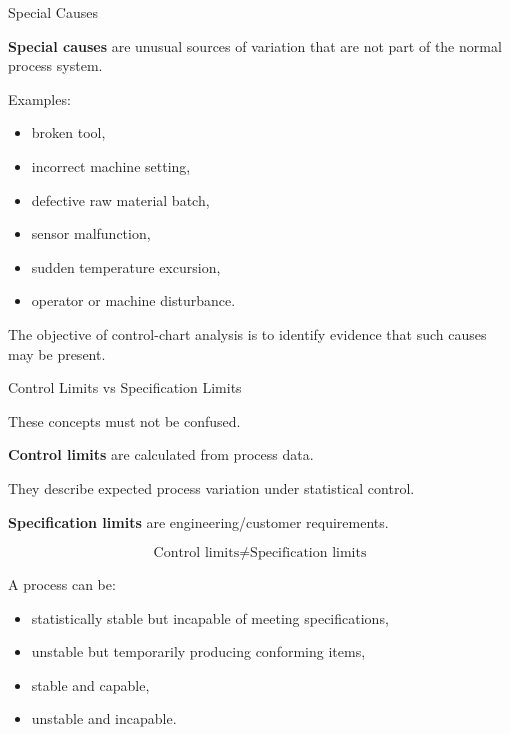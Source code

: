 \documentclass[aspectratio=169,10pt]{beamer}
\begin{document}

\begin{frame}[shrink=18]{Special Causes}
\small

\textbf{Special causes} are unusual sources of variation that are
not part of the normal process system.

Examples:

\begin{itemize}
    \item broken tool,
    \item incorrect machine setting,
    \item defective raw material batch,
    \item sensor malfunction,
    \item sudden temperature excursion,
    \item operator or machine disturbance.
\end{itemize}

The objective of control-chart analysis is to identify evidence
that such causes may be present.

\end{frame}


\begin{frame}[shrink=18]{Control Limits vs Specification Limits}
\small

These concepts must not be confused.

\textbf{Control limits} are calculated from process data.

They describe expected process variation under statistical control.

\textbf{Specification limits} are engineering/customer requirements.

\[
\boxed{
\text{Control limits}\neq\text{Specification limits}
}
\]

A process can be:

\begin{itemize}
    \item statistically stable but incapable of meeting specifications,
    \item unstable but temporarily producing conforming items,
    \item stable and capable,
    \item unstable and incapable.
\end{itemize}

\end{frame}
\end{document}
